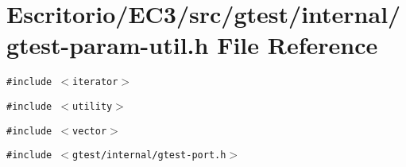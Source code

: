 \section{Escritorio/EC3/src/gtest/internal/gtest-param-util.h File Reference}
\label{gtest-param-util_8h}
{\tt \#include $<$iterator$>$}\par
{\tt \#include $<$utility$>$}\par
{\tt \#include $<$vector$>$}\par
{\tt \#include $<$gtest/internal/gtest-port.h$>$}\par

